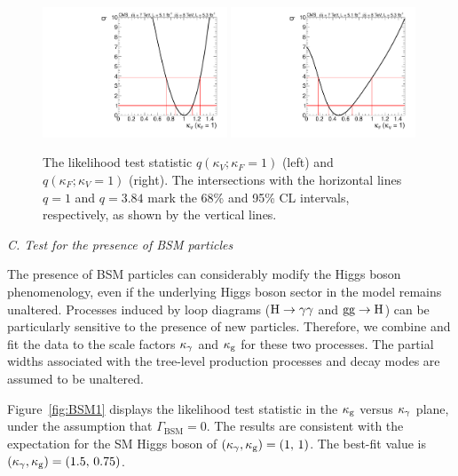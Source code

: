 \documentclass[12pt,twoside,a4paper,cmspaper,final,collab]{cms-tdr}
\begin{document}
\begin{figure}
\centering
\includegraphics[width=0.49\textwidth]{figures/comb/sqr_cvcf_cut_scan_2d_comb_HPA_smallGGScale_slice_CF} \hfill
\includegraphics[width=0.49\textwidth]{figures/comb/sqr_cvcf_cut_scan_2d_comb_HPA_smallGGScale_slice_CV}
\caption{
The likelihood test statistic $q(\kappa_V;\kappa_F=1)$ (left) and $q(\kappa_F;\kappa_V=1)$ (right).
The intersections with the horizontal lines $q=1$ and $q=3.84$ mark the 68\% and 95\% CL intervals, respectively,
as shown by the vertical lines.
}
\label{fig:cVcF_1D}
\end{figure}


\textit{C. Test for the presence of BSM particles}


The presence of BSM  particles can considerably modify the Higgs boson phenomenology,
even if the underlying Higgs boson sector in the model remains unaltered.
Processes induced by loop diagrams ($\mathrm{H} \to \gamma\gamma$ and $\mathrm{g}\mathrm{g} \to \mathrm{H}$)
can be particularly sensitive to the presence of new particles.
Therefore, we combine and fit the data to the scale factors $\kappa_{\gamma}$ and $\kappa_{\mathrm{g}}$
for these two processes. The partial widths associated with the tree-level production processes
and decay modes are assumed to be unaltered.

Figure~\ref{fig:BSM1} displays  the likelihood test statistic in the $\kappa_{\mathrm{g}}$ versus $\kappa_{\gamma}$ plane, under
the assumption that $\Gamma_{\mathrm{BSM}}=0$.
The results are consistent with the expectation for the SM Higgs boson
of $(\kappa_{\gamma}, \kappa_{\mathrm{g}})=(1, \,1)$.
The best-fit value is $(\kappa_{\gamma}, \kappa_{\mathrm{g}})=(1.5,\,0.75)$.
\end{document}

